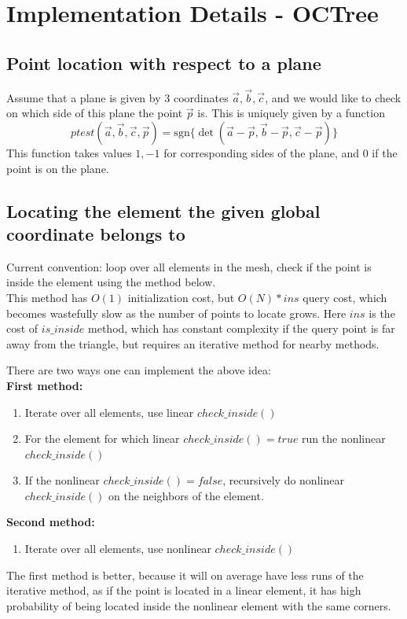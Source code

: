 \section{Implementation Details - OCTree}

\subsection{Point location with respect to a plane}

Assume that a plane is given by 3 coordinates $\vec{a}, \vec{b}, \vec{c}$, and we would like to check on which side of this plane the point $\vec{p}$ is. This is uniquely given by a function
\begin{equation}
\label{equation-point-plane-test}
	ptest(\vec{a}, \vec{b}, \vec{c}, \vec{p}) = \mathrm{sgn} \{ \det (\vec{a} - \vec{p}, \vec{b} - \vec{p}, \vec{c} - \vec{p}) \}
\end{equation}
\noindent
This function takes values $1,-1$ for corresponding sides of the plane, and $0$ if the point is on the plane.

\subsection{Locating the element the given global coordinate belongs to}
\label{subsection-locating-element}

\noindent
Current convention: loop over all elements in the mesh, check if the point is inside the element using the method below. \\


\noindent
This method has $O(1)$ initialization cost, but $O(N) * ins$ query cost, which becomes wastefully slow as the number of points to locate grows. Here $ins$ is the cost of $is\_inside$ method, which has constant complexity if the query point is far away from the triangle, but requires an iterative method for nearby methods.

\noindent
There are two ways one can implement the above idea: \\
\textbf{First method:}
\begin{enumerate}
	\item Iterate over all elements, use linear $check\_inside()$
	\item For the element for which linear $check\_inside() = true$ run the nonlinear $check\_inside()$
	\item If the nonlinear $check\_inside() = false$, recursively do nonlinear $check\_inside()$ on the neighbors of the element.
\end{enumerate}
\textbf{Second method:}
\begin{enumerate}
	\item Iterate over all elements, use nonlinear $check\_inside()$
\end{enumerate}
\noindent
The first method is better, because it will on average have less runs of the iterative method, as if the point is located in a linear element, it has high probability of being located inside the nonlinear element with the same corners. \\

